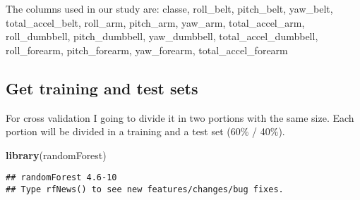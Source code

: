 \documentclass[]{article}
\newenvironment{Shaded}{\begin{snugshade}}{\end{snugshade}}
\newcommand{\KeywordTok}[1]{\textcolor[rgb]{0.13,0.29,0.53}{\textbf{{#1}}}}
\newcommand{\NormalTok}[1]{{#1}}
\begin{document}
The columns used in our study are: classe, roll\_belt, pitch\_belt,
yaw\_belt, total\_accel\_belt, roll\_arm, pitch\_arm, yaw\_arm,
total\_accel\_arm, roll\_dumbbell, pitch\_dumbbell, yaw\_dumbbell,
total\_accel\_dumbbell, roll\_forearm, pitch\_forearm, yaw\_forearm,
total\_accel\_forearm

\subsection{Get training and test
sets}\label{get-training-and-test-sets}

For cross validation I going to divide it in two portions with the same
size. Each portion will be divided in a training and a test set (60\% /
40\%).

\begin{Shaded}
\begin{Highlighting}[]
\KeywordTok{library}\NormalTok{(randomForest)}
\end{Highlighting}
\end{Shaded}

\begin{verbatim}
## randomForest 4.6-10
## Type rfNews() to see new features/changes/bug fixes.
\end{verbatim}
\end{document}
